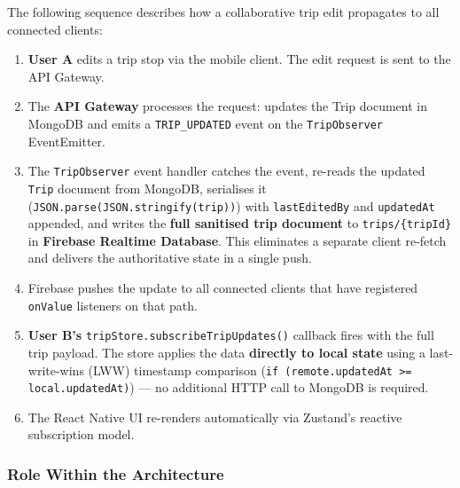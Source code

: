 \documentclass[12pt, a4paper]{article}
\newcommand{\code}[1]{\texttt{\small #1}}
\begin{document}
The following sequence describes how a collaborative trip edit propagates to all connected clients:

\begin{enumerate}
  \item \textbf{User A} edits a trip stop via the mobile client. The edit request is sent to the API Gateway.
  \item The \textbf{API Gateway} processes the request: updates the Trip document in MongoDB and emits a \code{TRIP\_UPDATED} event on the \code{TripObserver} EventEmitter.
  \item The \code{TripObserver} event handler catches the event, re-reads the updated \code{Trip} document from MongoDB, serialises it (\code{JSON.parse(JSON.stringify(trip))}) with \code{lastEditedBy} and \code{updatedAt} appended, and writes the \textbf{full sanitised trip document} to \code{trips/\{tripId\}} in \textbf{Firebase Realtime Database}. This eliminates a separate client re-fetch and delivers the authoritative state in a single push.
  \item Firebase pushes the update to all connected clients that have registered \code{onValue} listeners on that path.
  \item \textbf{User B's} \code{tripStore.subscribeTripUpdates()} callback fires with the full trip payload. The store applies the data \textbf{directly to local state} using a last-write-wins (LWW) timestamp comparison (\code{if (remote.updatedAt >= local.updatedAt)}) --- no additional HTTP call to MongoDB is required.
  \item The React Native UI re-renders automatically via Zustand's reactive subscription model.
\end{enumerate}

\subsubsection{Role Within the Architecture}
\end{document}
